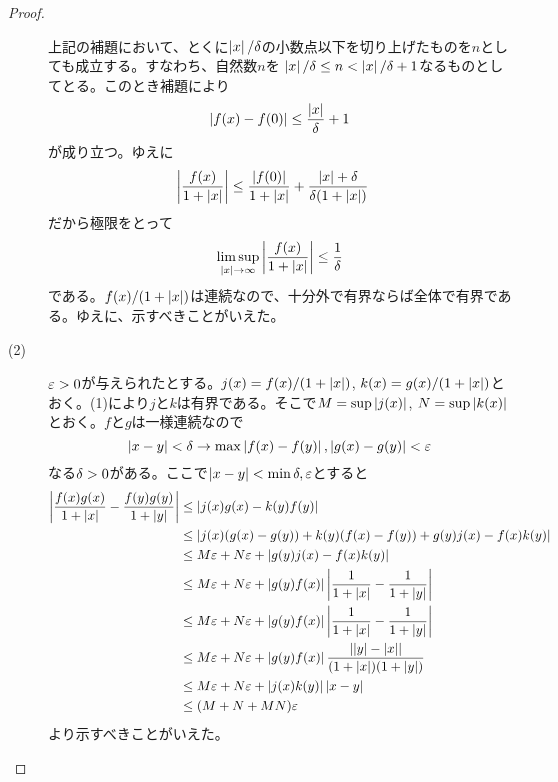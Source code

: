 \begin{proof}
\begin{description}
    上記の補題において、とくに$\abs{x}/ \grd$の小数点以下を切り上げたものを$n$としても成立する。すなわち、自然数$n$を
    $\abs{x}/ \grd \leq n < \abs{x}/ \grd + 1$なるものとしてとる。このとき補題により
    \[
    \abs{f(x) - f(0)} \leq \f{ \abs{x} }{ \grd } + 1
    \]
    が成り立つ。ゆえに
    \begin{align*}
      \abs{ \f{f(x)}{1 + \abs{x} } } &\leq    \f{ \abs{f(0)} }{1 + \abs{x}}  +  \f{ \abs{x} + \grd }{ \grd( 1 + \abs{x} ) }
    \end{align*}
    だから極限をとって
    \[
    \limsup_{\abs{x} \to \infty}   \abs{ \f{f(x)}{1 + \abs{x} } } \leq \f{1}{\grd}
    \]
    である。$f(x)/(1 + \abs{x})$は連続なので、十分外で有界ならば全体で有界である。ゆえに、示すべきことがいえた。
    \item[(2)] $\ve > 0$が与えられたとする。$j(x) = f(x)/(1 + \abs{x})$, $k(x) = g(x)/(1 + \abs{x})$とおく。(1)により$j$と$k$は有界である。そこで$M = \sup \abs{j(x)}$, $N = \sup \abs{k(x)}$とおく。$f$と$g$は一様連続なので
    \[
    \abs{x -y } < \grd \to \max{ \abs{ f(x) - f(y) },  \abs{ g(x) - g(y) }} < \ve
     \]
     なる$\grd > 0$がある。ここで$\abs{x - y} < \min{\grd, \ve}$とすると
     \begin{align*}
      \abs{ \f{f(x)g(x)}{1 + \abs{x}} - \f{f(y)g(y)}{1 + \abs{y}} } &\leq \abs{  j(x)g(x) - k(y)f(y)   } \\
      &\leq   \abs{  j(x)(g(x)-g(y)) + k(y)(f(x)-f(y)) + g(y)j(x)  - f(x)k(y)    } \\
      &\leq M \ve + N \ve + \abs{  g(y)j(x)  - f(x)k(y) } \\
      &\leq M \ve + N \ve + \abs{  g(y)f(x) } \abs{ \f{1}{1 + \abs{x} } - \f{1}{1 + \abs{y} }} \\
      &\leq M \ve + N \ve + \abs{  g(y)f(x) } \abs{ \f{1}{1 + \abs{x} } - \f{1}{1 + \abs{y} }} \\
      &\leq M \ve + N \ve + \abs{  g(y)f(x) }  \f{ \abs{ \abs{y} - \abs{x} } }{ (1 + \abs{x})(1 + \abs{y})} \\
      &\leq M \ve + N \ve + \abs{  j(x)k(y) } \abs{x - y }  \\
      &\leq (M  + N  + MN) \ve
     \end{align*}
     より示すべきことがいえた。
  \end{description}
\end{proof}

\newpage

